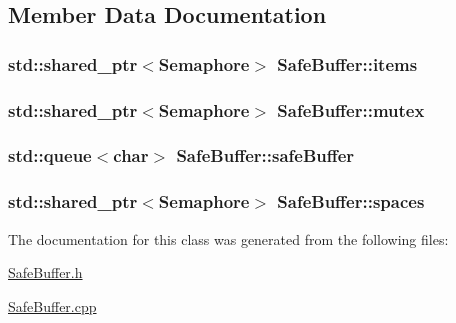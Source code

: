 \subsection{Member Data Documentation}
\subsubsection[{\texorpdfstring{items}{items}}]{\setlength{\rightskip}{0pt plus 5cm}std\+::shared\+\_\+ptr$<${\bf Semaphore}$>$ Safe\+Buffer\+::items}\hypertarget{class_safe_buffer_aab374b9839a583473e1ec8938715a8e7}{}\label{class_safe_buffer_aab374b9839a583473e1ec8938715a8e7}
\subsubsection[{\texorpdfstring{mutex}{mutex}}]{\setlength{\rightskip}{0pt plus 5cm}std\+::shared\+\_\+ptr$<${\bf Semaphore}$>$ Safe\+Buffer\+::mutex}\hypertarget{class_safe_buffer_a7f90950b182359904348ff978ebb96c6}{}\label{class_safe_buffer_a7f90950b182359904348ff978ebb96c6}
\subsubsection[{\texorpdfstring{safe\+Buffer}{safeBuffer}}]{\setlength{\rightskip}{0pt plus 5cm}std\+::queue$<$char$>$ Safe\+Buffer\+::safe\+Buffer}\hypertarget{class_safe_buffer_a8db738cc1b4be3eeba47f322008a2c3e}{}\label{class_safe_buffer_a8db738cc1b4be3eeba47f322008a2c3e}
\subsubsection[{\texorpdfstring{spaces}{spaces}}]{\setlength{\rightskip}{0pt plus 5cm}std\+::shared\+\_\+ptr$<${\bf Semaphore}$>$ Safe\+Buffer\+::spaces}\hypertarget{class_safe_buffer_aa8de2bc2e0f6672f448ef0095faacf8c}{}\label{class_safe_buffer_aa8de2bc2e0f6672f448ef0095faacf8c}


The documentation for this class was generated from the following files\+:\begin{DoxyCompactItemize}
\item 
\hyperlink{_safe_buffer_8h}{Safe\+Buffer.\+h}\item 
\hyperlink{_safe_buffer_8cpp}{Safe\+Buffer.\+cpp}\end{DoxyCompactItemize}
